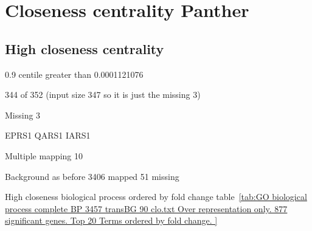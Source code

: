 \clearpage





\section{Closeness centrality Panther}
\subsection{High closeness centrality}

0.9 centile greater than 0.0001121076 

344 of 352 (input size 347 so it is just the missing 3)

Missing 3

EPRS1
QARS1
IARS1



Multiple mapping 10





Background as before 3406 mapped 51 missing


High closeness biological process ordered by fold change table~\ref{tab:GO biological process complete BP 3457 transBG 90 clo.txt Over representation only. 877 significant genes. Top 20 Terms ordered by fold change. }




